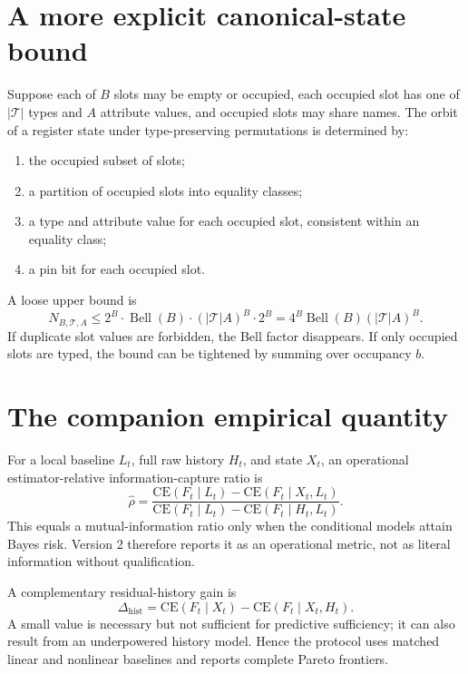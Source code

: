 \documentclass[11pt]{article}
\begin{document}
\appendix

\section{A more explicit canonical-state bound}\label{a-more-explicit-canonical-state-bound}

Suppose each of \(B\) slots may be empty or occupied, each occupied slot has one of \(|\mathcal{T}|\) types and \(A\) attribute values, and occupied slots may share names. The orbit of a register state under type-preserving permutations is determined by:

\begin{enumerate}
\def\labelenumi{\arabic{enumi}.}
\item
  the occupied subset of slots;
\item
  a partition of occupied slots into equality classes;
\item
  a type and attribute value for each occupied slot, consistent within an equality class;
\item
  a pin bit for each occupied slot.
\end{enumerate}

A loose upper bound is \[N_{B,\mathcal{T},A}
\leq 2^B\cdot\operatorname{Bell}(B)\cdot(|\mathcal{T}|A)^B\cdot2^B
=4^B\operatorname{Bell}(B)(|\mathcal{T}|A)^B.\] If duplicate slot values are forbidden, the Bell factor disappears. If only occupied slots are typed, the bound can be tightened by summing over occupancy \(b\).

\section{The companion empirical quantity}\label{the-companion-empirical-quantity}

For a local baseline \(L_t\), full raw history \(H_t\), and state \(X_t\), an operational estimator-relative information-capture ratio is \[\widehat\rho
=
\frac{\mathrm{CE}(F_t\mid L_t)-\mathrm{CE}(F_t\mid X_t,L_t)}
{\mathrm{CE}(F_t\mid L_t)-\mathrm{CE}(F_t\mid H_t,L_t)}.\] This equals a mutual-information ratio only when the conditional models attain Bayes risk. Version 2 therefore reports it as an operational metric, not as literal information without qualification.

A complementary residual-history gain is \[\Delta_{\mathrm{hist}}
=
\mathrm{CE}(F_t\mid X_t)-\mathrm{CE}(F_t\mid X_t,H_t).\] A small value is necessary but not sufficient for predictive sufficiency; it can also result from an underpowered history model. Hence the protocol uses matched linear and nonlinear baselines and reports complete Pareto frontiers.
\end{document}
